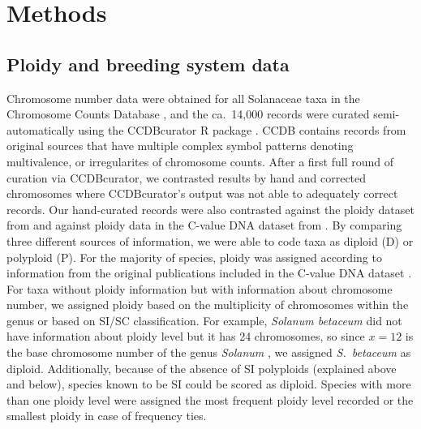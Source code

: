 \section{Methods}

\subsection{Ploidy and breeding system data}


Chromosome number data were obtained for all Solanaceae taxa in the Chromosome Counts Database \citep[CCDB;][]{rice_2015}, and the ca.~14,000 records were curated semi-automatically using the CCDBcurator R package \citep{rivero_2019}.
CCDB contains records from original sources that have multiple complex symbol patterns denoting multivalence, or irregularites of chromosome counts.
After a first full round of curation via CCDBcurator, we contrasted results by hand and corrected chromosomes where CCDBcurator's output was not able to adequately correct records.
Our hand-curated records were also contrasted against the ploidy dataset from \citet{robertson_2011} and against ploidy data in the C-value DNA dataset from \citet{bennett_2005}.
By comparing three different sources of information, we were able to code taxa as diploid (D) or polyploid (P).
For the majority of species, ploidy was assigned according to information from the original publications included in the  C-value DNA dataset \citep{bennett_2005}.
For taxa without ploidy information but with information about chromosome number, we assigned ploidy based on the multiplicity of chromosomes within the genus or based on SI/SC classification.
For example, \textit{Solanum betaceum} did not have information about ploidy level but it has 24 chromosomes, so since $x=12$ is the base chromosome number of the genus \textit{Solanum} \citep{olmstead_2007}, we assigned \textit{S.~betaceum} as diploid. 
Additionally, because of the absence of SI polyploids (explained above and below), species known to be SI could be scored as diploid.
Species with more than one ploidy level were assigned the most frequent ploidy level recorded or the smallest ploidy in case of frequency ties.

